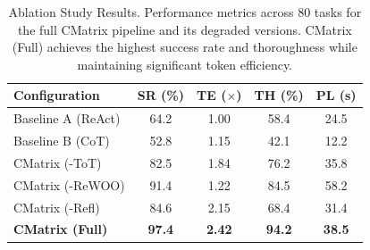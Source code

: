 
\begin{table}[htbp]
  \centering
  \caption{Ablation Study Results. Performance metrics across 80 tasks for the full CMatrix pipeline and its degraded versions. CMatrix (Full) achieves the highest success rate and thoroughness while maintaining significant token efficiency.}
  \label{tab:ablation-results}
  \begin{tabular}{lcccc}
    \toprule
    \textbf{Configuration} & \textbf{SR (\%)} & \textbf{TE ($\times$)} & \textbf{TH (\%)} & \textbf{PL (s)} \\
    \midrule
    Baseline A (ReAct) & 64.2 & 1.00 & 58.4 & 24.5 \\
    Baseline B (CoT) & 52.8 & 1.15 & 42.1 & 12.2 \\
    \midrule
    CMatrix (-ToT) & 82.5 & 1.84 & 76.2 & 35.8 \\
    CMatrix (-ReWOO) & 91.4 & 1.22 & 84.5 & 58.2 \\
    CMatrix (-Refl) & 84.6 & 2.15 & 68.4 & 31.4 \\
    \midrule
    \textbf{CMatrix (Full)} & \textbf{97.4} & \textbf{2.42} & \textbf{94.2} & \textbf{38.5} \\
    \bottomrule
  \end{tabular}
\end{table}
